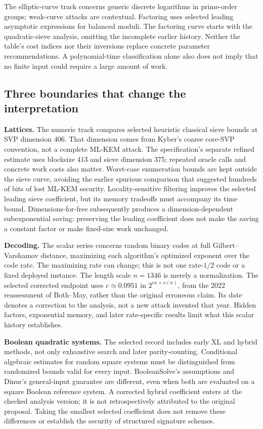 The elliptic-curve track concerns generic discrete logarithms in prime-order groups; weak-curve attacks are contextual. Factoring uses selected leading asymptotic expressions for balanced moduli. The factoring curve starts with the quadratic-sieve analysis, omitting the incomplete earlier history. Neither the table's cost indices nor their inversions replace concrete parameter recommendations. A polynomial-time classification alone also does not imply that no finite input could require a large amount of work.

\subsection{Three boundaries that change the interpretation}
\textbf{Lattices.} The numeric track compares selected heuristic classical sieve bounds at SVP dimension 406. That dimension comes from Kyber's coarse core-SVP convention, not a complete ML-KEM attack. The specification's separate refined estimate uses blocksize 413 and sieve dimension 375; repeated oracle calls and concrete work costs also matter.\cite{kyberhistory} Worst-case enumeration bounds are kept outside the sieve curve, avoiding the earlier spurious comparison that suggested hundreds of bits of lost ML-KEM security. Locality-sensitive filtering improves the selected leading sieve coefficient, but its memory tradeoffs must accompany its time bound.\cite{bdglhistory} Dimensions-for-free subsequently produces a dimension-dependent subexponential saving: preserving the leading coefficient does not make the saving a constant factor or make fixed-size work unchanged.\cite{ducastfree}

\textbf{Decoding.} The scalar series concerns random binary codes at full Gilbert--Varshamov distance, maximizing each algorithm's optimized exponent over the code rate. The maximizing rate can change; this is not one rate-$1/2$ code or a fixed deployed instance. The length scale $n=1346$ is merely a normalization. The selected corrected endpoint uses $c\simeq0.0951$ in $2^{cn+o(n)}$, from the 2022 reassessment of Both--May, rather than the original erroneous claim.\cite{esserhistory,codesievehistory} Its date denotes a correction to the analysis, not a new attack invented that year. Hidden factors, exponential memory, and later rate-specific results limit what this scalar history establishes.

\textbf{Boolean quadratic systems.} The selected record includes early XL and hybrid methods, not only exhaustive search and later parity-counting. Conditional algebraic estimates for random square systems must be distinguished from randomized bounds valid for every input. BooleanSolve's assumptions and Dinur's general-input guarantee are different, even when both are evaluated on a square Boolean reference system.\cite{booleansolvehistory,dinurhistory} A corrected hybrid coefficient enters at the checked analysis version; it is not retrospectively attributed to the original proposal.\cite{fxlhistory} Taking the smallest selected coefficient does not remove these differences or establish the security of structured signature schemes.

